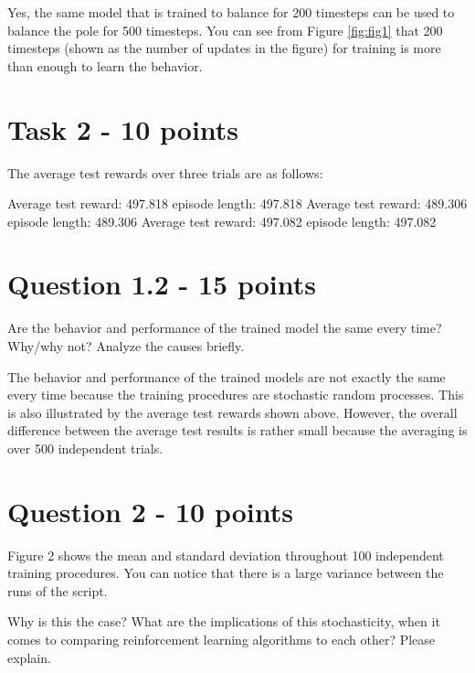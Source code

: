 \documentclass[12pt]{article}
\begin{document}
\noindent
Yes, the same model that is trained to balance for 200 timesteps can be used to balance the pole for 500 timesteps. 
You can see from Figure \ref*{fig:fig1} that 200 timesteps (shown as the number of updates in the figure) for training is more than enough to learn the behavior. 

\section*{Task 2 - 10 points}

The average test rewards over three trials are as follows:
\newline

Average test reward: 497.818 episode length: 497.818
\newline
\indent
Average test reward: 489.306 episode length: 489.306
\newline
\indent
Average test reward: 497.082 episode length: 497.082

\section*{Question 1.2 - 15 points}

Are the behavior and performance of the trained model the same every time?
Why/why not? Analyze the causes briefly.
\newline

\noindent
The behavior and performance of the trained models are not exactly the same every time because the training procedures are stochastic random processes. This is also illustrated by the average test rewards shown above. However, the overall difference between the average test results is rather small because the averaging is over 500 independent trials.


\section*{Question 2 - 10 points}

Figure 2 shows the mean and standard deviation throughout 100 independent training procedures. You can notice that there is a large variance between the runs of the script.
\newline

Why is this the case? What are the implications of this stochasticity, when it comes to comparing reinforcement learning algorithms to each other? Please explain.
\newline
\end{document}
